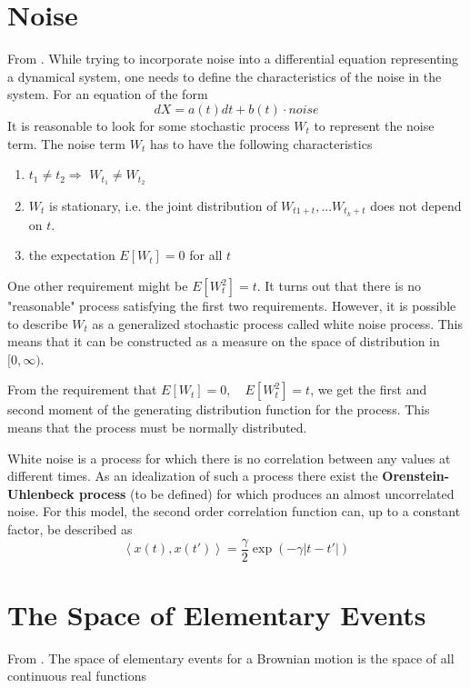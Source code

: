 \documentclass[12pt]{book}
\begin{document}
\section{Noise}\label{section:noise}
From \cite{Oksendal14}. While trying to incorporate noise into a differential equation representing a dynamical system, one needs to define the characteristics of the noise in the system. For an equation of the form 
\begin{equation*}
dX=a(t)dt +b(t)\cdot noise
\end{equation*}
It is reasonable to look for some stochastic process $W_t$ to represent the noise term. The noise term $W_t$ has to have the following characteristics
\begin{enumerate}
	\item $t_1\neq t_2 \Rightarrow$ $W_{t_1}\neq W_{t_2}$
	\item ${W_t}$ is stationary, i.e. the joint distribution of $W_{t1+t},...W_{t_k+t}$ does not depend on $t$. 
	\item the expectation $E[W_t]=0$ for all $t$
\end{enumerate}
One other requirement might be $E[W_t^2]=t$. It turns out that there is no "reasonable" process satisfying the first two requirements. However, it is possible to describe $W_t$ as a generalized stochastic process called white noise process. This means that it can be constructed as a measure on the space of distribution in $[0, \infty)$.

From the requirement that $E[W_t]=0,\quad E[W_t^2]=t$, we get the first and second moment of the generating distribution function for the process. This means that the process must be normally distributed. 

White noise is a process for which there is no correlation between any values at different times. As an idealization of such a process there exist the \textbf{Orenstein-Uhlenbeck process} (to be defined) for which produces an almost uncorrelated noise. For this model, the second order correlation function can, up to a constant factor, be described as 
\begin{equation*}
\left<x(t),x(t')\right>= \frac{\gamma}{2}\exp(-\gamma|t-t'|)
\end{equation*}

\section{The Space of Elementary Events}\label{section:theSpaceOfElementaryEvents}
From \cite{schuss2009theory}. The space of elementary events for a Brownian motion is the space of all continuous real functions 
\end{document}
